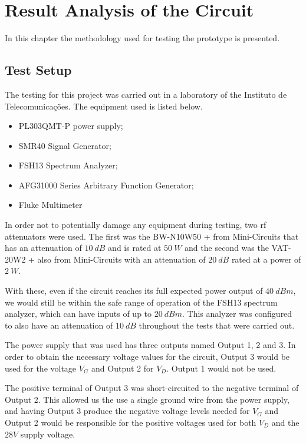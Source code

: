 \chapter{Result Analysis of the Circuit}
\label{chapter:testing}

\par In this chapter the methodology used for testing the prototype is presented. 

\section{Test Setup}
\par The testing for this project was carried out in a laboratory of the Instituto de Telecomunicações. The equipment used is listed below.

\begin{itemize}
    \item PL303QMT-P power supply;
    \item SMR40 Signal Generator;
    \item FSH13 Spectrum Analyzer;
    \item AFG31000 Series Arbitrary Function Generator;
    \item Fluke Multimeter
\end{itemize}

\par In order not to potentially damage any equipment during testing, two \ac{rf} attenuators were used. The first was the BW-N10W50 + from Mini-Circuits that has an attenuation of $10\:\si{dB}$ and is rated at $50\:\si{W}$ and the second was the VAT-20W2 + also from Mini-Circuits with an attenuation of $20\:\si{dB}$ rated at a power of $2\:\si{W}$.

\par With these, even if the circuit reaches its full expected power output of $40\:\si{dBm}$, we would still be within the safe range of operation of the FSH13 spectrum analyzer, which can have inputs of up to $20\:\si{dBm}$. This analyzer was configured to also have an attenuation of $10\:\si{dB}$ throughout the tests that were carried out.

\par The power supply that was used has three outputs named Output 1, 2 and 3. In order to obtain the necessary voltage values for the circuit, Output 3 would be used for the voltage $V_{G}$ and Output 2 for $V_{D}$. Output 1 would not be used.

\par The positive terminal of Output 3 was short-circuited to the negative terminal of Output 2. This allowed us the use a single ground wire from the power supply, and having Output 3 produce the negative voltage levels needed for $V_{G}$ and Output 2 would be responsible for the positive voltages used for both $V_{D}$ and the $28V$ supply voltage.

